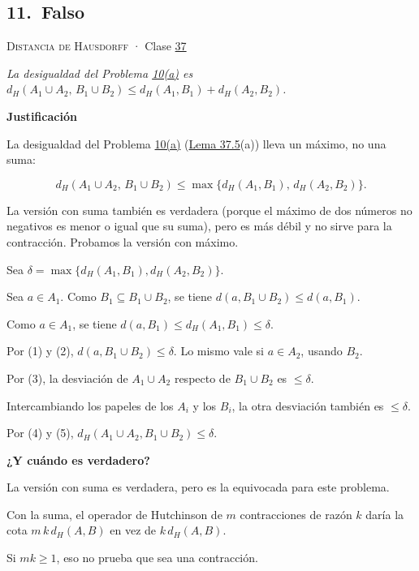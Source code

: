 \documentclass[11pt,a4paper]{article}
\newcommand{\bloque}[1]{\par\smallskip\noindent\textbf{\color{acento}#1}\par}
\begin{document}
\subsection*{\hypertarget{r-11}{}11.\ \textcolor{bad}{Falso}}
{\small \textsc{Distancia de Hausdorff} · Clase \href{https://decostruttivismo.github.io/MAT2514-repaso/pdf/MAT2514_apuntes_completos.pdf\#nameddest=section.37}{37}}\par
\emph{La desigualdad del Problema \hyperlink{prob-10}{10(a)} es $d_H(A_1\cup A_2,\,B_1\cup B_2)\le d_H(A_1,B_1)+d_H(A_2,B_2)$.}
\bloque{Justificación}
\begin{pasos}
\item[] La desigualdad del Problema \hyperlink{prob-10}{10(a)} (\href{https://decostruttivismo.github.io/MAT2514-repaso/pdf/MAT2514_apuntes_completos.pdf\#nameddest=teorema.37.5}{Lema 37.5}(a)) lleva un máximo, no una suma:
\item[] \[d_H(A_1\cup A_2,\,B_1\cup B_2)\le\max\{d_H(A_1,B_1),\,d_H(A_2,B_2)\}.\]
\item[] La versión con suma también es verdadera (porque el máximo de dos números no negativos es menor o igual que su suma), pero es más débil y no sirve para la contracción. Probamos la versión con máximo.
\item[] Sea $\delta=\max\{d_H(A_1,B_1),d_H(A_2,B_2)\}$.
\item[(1)] Sea $a\in A_1$. Como $B_1\subseteq B_1\cup B_2$, se tiene $d(a,B_1\cup B_2)\le d(a,B_1)$.
\item[(2)] Como $a\in A_1$, se tiene $d(a,B_1)\le d_H(A_1,B_1)\le\delta$.
\item[(3)] Por (1) y (2), $d(a,B_1\cup B_2)\le\delta$. Lo mismo vale si $a\in A_2$, usando $B_2$.
\item[(4)] Por (3), la desviación de $A_1\cup A_2$ respecto de $B_1\cup B_2$ es $\le\delta$.
\item[(5)] Intercambiando los papeles de los $A_i$ y los $B_i$, la otra desviación también es $\le\delta$.
\item[] Por (4) y (5), $d_H(A_1\cup A_2,B_1\cup B_2)\le\delta$.
\end{pasos}
\bloque{¿Y cuándo es verdadero?}
\begin{pasos}
\item[] La versión con suma es verdadera, pero es la equivocada para este problema.
\item[] Con la suma, el operador de Hutchinson de $m$ contracciones de razón $k$ daría la cota $m\,k\,d_H(A,B)$ en vez de $k\,d_H(A,B)$.
\item[] Si $mk\ge1$, eso no prueba que sea una contracción.
\end{pasos}
\end{document}
